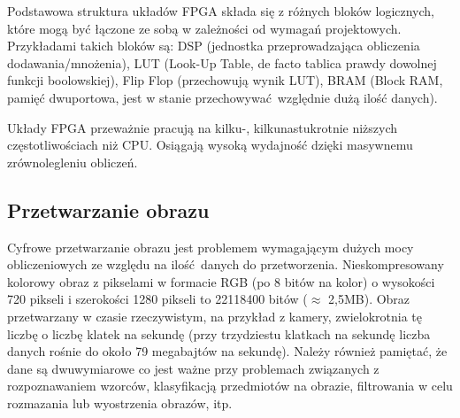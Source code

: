 \documentclass[12pt, oneside, a4paper]{article}
\begin{document}
Podstawowa struktura układów FPGA składa się z różnych bloków logicznych,
które mogą być łączone ze sobą w zależności od wymagań projektowych.
Przykładami takich bloków są:
DSP (jednostka przeprowadzająca obliczenia dodawania/mnożenia),
LUT (Look-Up Table, de facto tablica prawdy dowolnej funkcji boolowskiej),
Flip Flop (przechowują wynik LUT), BRAM (Block RAM, pamięć dwuportowa,
jest w stanie przechowywać względnie dużą ilość danych).

Układy FPGA przeważnie pracują na kilku-, kilkunastukrotnie niższych
częstotliwościach niż CPU. Osiągają wysoką wydajność
dzięki masywnemu zrównolegleniu obliczeń.

\subsection{Przetwarzanie obrazu}
Cyfrowe przetwarzanie obrazu jest problemem wymagającym dużych mocy
obliczeniowych ze względu na ilość danych do przetworzenia. Nieskompresowany
kolorowy obraz z pikselami w formacie RGB (po 8 bitów na kolor) o wysokości
720 pikseli i szerokości 1280 pikseli to 22118400 bitów (\(\approx \) 2,5MB). Obraz
przetwarzany w czasie rzeczywistym, na przykład z kamery, zwielokrotnia tę
liczbę o liczbę klatek na sekundę (przy trzydziestu klatkach na sekundę liczba
danych rośnie do około 79 megabajtów na sekundę). Należy również pamiętać, że
dane są dwuwymiarowe co jest ważne przy problemach związanych z rozpoznawaniem
wzorców, klasyfikacją przedmiotów na obrazie, filtrowania w celu rozmazania lub
wyostrzenia obrazów, itp.
\end{document}
